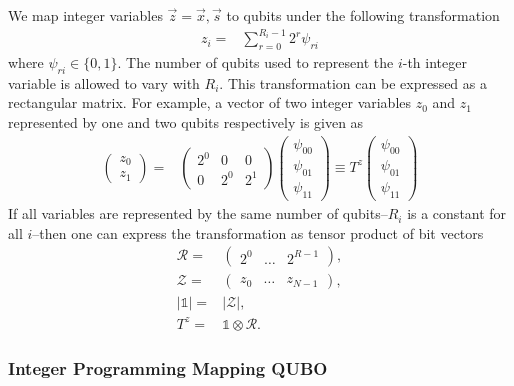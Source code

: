 \documentclass[prd,twocolumn,tightenlines,preprintnumbers,showpacs,superscriptaddress,notitlepage,nofootinbib,eqsecnum,floatfix,longbibliography]{revtex4}
\begin{document}
We map integer variables $\vec z = \vec x, \vec s$ to qubits under the following transformation~\cite{Chang:2018uoc}
\begin{align}
    z_i = & \sum_{r=0}^{R_i-1} 2^r \psi_{ri}
\label{eq:int_to_bin}
\end{align}
where $\psi_{ri} \in \{0, 1\}$.
The number of qubits used to represent the $i$-th integer variable is allowed to vary with $R_i$.
This transformation can be expressed as a rectangular matrix.
For example, a vector of two integer variables $z_0$ and $z_1$ represented by one and two qubits respectively is given as
\begin{align}
    \begin{pmatrix}
    z_0\\
    z_1
    \end{pmatrix}
    = &
    \begin{pmatrix}
    2^0 & 0 & 0\\
    0 & 2^0 & 2^1
    \end{pmatrix}
    \begin{pmatrix}
    \psi_{00}\\
    \psi_{01}\\
    \psi_{11}
    \end{pmatrix}
    \equiv T^z \begin{pmatrix}
    \psi_{00}\\
    \psi_{01}\\
    \psi_{11}
    \end{pmatrix}
\end{align}
If all variables are represented by the same number of qubits--$R_i$ is a constant for all $i$--then one can express the transformation as tensor product of bit vectors
\begin{align}
    \mathcal{R} = & \begin{pmatrix} 2^0 & \dots & 2^{R-1}\end{pmatrix},\\
    \mathcal{Z} = & \begin{pmatrix} z_0 & \dots & z_{N-1}\end{pmatrix},\\
    |\mathds{1}| = & |\mathcal{Z}|,\\
    T^z = & \mathds{1}\otimes \mathcal{R}.
\end{align}



\subsubsection{Integer Programming Mapping QUBO}
\label{sec:methods:ilp-qubo}
\end{document}
